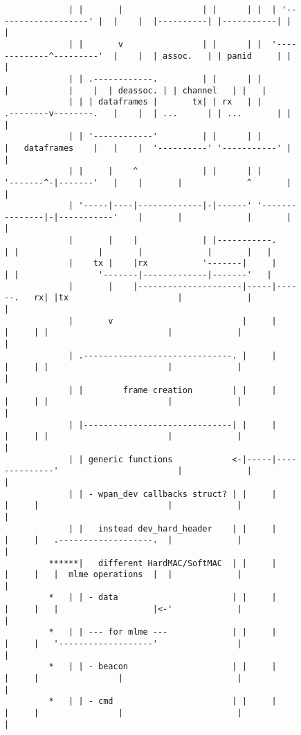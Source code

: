 \begin{figure}
{\begin{verbatim}
             | |       |                | |      | |  | '-------------------' |  |    |  |----------| |-----------| |   |
             | |       v                | |      | |  '-------------^---------'  |    |  | assoc.   | | panid     | |   |
             | | .------------.         | |      | |                |            |    |  | deassoc. | | channel   | |   |
             | | | dataframes |       tx| | rx   | |       .--------v--------.   |    |  | ...      | | ...       | |   |
             | | '------------'         | |      | |       |   dataframes    |   |    |  '----------' '-----------' |   |
             | |     |    ^             | |      | |       '-------^-|-------'   |    |       |             ^       |   |
             | '-----|----|-------------|-|------' '---------------|-|-----------'    |       |             |       |   |
             |       |    |             | |-----------.            | |                |       |             |       |   |
             |    tx |    |rx           '-------|     |            | |                '-------|-------------|-------'   |
             |       |    |---------------------|-----|------.   rx| |tx                      |             |           |
             |       v                          |     |      |     | |                        |             |           |
             | .------------------------------. |     |      |     | |                        |             |           |
             | |        frame creation        | |     |      |     | |                        |             |           |
             | |------------------------------| |     |      |     | |                        |             |           |
             | | generic functions            <-|-----|--------------'                        |             |           |
             | | - wpan_dev callbacks struct? | |     |      |     |                          |             |           |
             | |   instead dev_hard_header    | |     |      |     |   .-------------------.  |             |           |
         ******|   different HardMAC/SoftMAC  | |     |      |     |   |  mlme operations  |  |             |           |
         *   | | - data                       | |     |      |     |   |                   |<-'             |           |
         *   | | --- for mlme ---             | |     |      |     |   '-------------------'                |           |
         *   | | - beacon                     | |     |      |     |                |                       |           |
         *   | | - cmd                        | |     |      |     |                |                       |           |

\end{verbatim}}
\end{figure}
